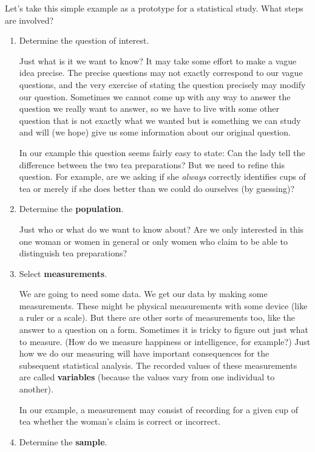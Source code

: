 \documentclass[twoside]{book}
\def\myindex#1{\index{#1}}
\def\term#1{\textbf{#1}}
\newcounter{example}[section]
\begin{document}
Let's take this simple example as a prototype for a statistical study.
What steps are involved?  
\begin{enumerate}
  \item Determine the question of interest.

	Just what is it we want to know?  It may take some effort to 
	make a vague idea precise.  The precise questions may not exactly
	correspond to our vague questions, and the very exercise of 
	stating the question precisely may modify our question.  Sometimes
	we cannot come up with any way to answer the question we really want
	to answer, so we have to live with some other question that is 
	not exactly what we wanted but is something we can study and will
	(we hope) give us some information about our original question.

	In our example this question seems fairly easy to state:
	Can the lady tell the difference between the two tea preparations?
	But we need to refine this question.  For example, are we 
	asking if she \emph{always} correctly identifies cups of tea
	or merely if she does better than we could do ourselves (by 
	guessing)?  

  \item 
	Determine the \term{population}. 
	\myindex{population}%

	Just who or what do we want to know about?  Are we only interested in
	this one woman or women in general or only women who claim to
	be able to distinguish tea preparations?

  \item
	Select \term{measurements}.

	We are going to need some data.  
	We get our data by making some measurements.
	These might be physical measurements with some device (like a ruler
	or a scale).
	But there are other sorts of measurements too, 
	like the answer to a question on a form.
	Sometimes it is tricky to figure out just what to measure.
	(How do we measure happiness or intelligence, for example?)
	Just how we do our measuring will have important consequences 
	for the subsequent statistical analysis.
	The recorded values of these measurements are called
	\term{variables} (because the values vary from one individual to another).

	In our example, a measurement may consist of recording for a given
	cup of tea whether the woman's claim is correct or incorrect.

  \item
	Determine the \term{sample}.
	\myindex{sample}%


\end{enumerate}
\end{document}
